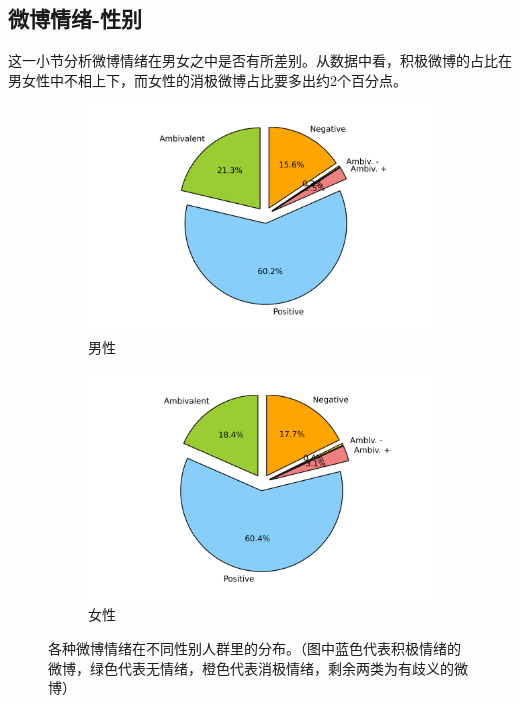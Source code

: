\documentclass[12pt, oneside]{article}
\begin{document}
\begin{spacing}{1.5}
\begin{CJK}{UTF8}{gbsn}
\subsection{微博情绪-性别}
这一小节分析微博情绪在男女之中是否有所差别。从数据中看，积极微博的占比在男女性中不相上下，而女性的消极微博占比要多出约2个百分点。

\begin{figure}
	\centering
	\begin{subfigure}[b]{0.45\linewidth}
		\centering
		\includegraphics[trim = 1.5cm 0 1.5cm 0, clip = true, width=\textwidth]{../result/charts/emotion_gender_m}
		\caption{男性}
	\end{subfigure}
	\begin{subfigure}[b]{0.45\linewidth}
		\centering
		\includegraphics[trim = 1.5cm 0 1.5cm 0, clip = true, width=\textwidth]{../result/charts/emotion_gender_f}
		\caption{女性}
	\end{subfigure}
	\caption{各种微博情绪在不同性别人群里的分布。（图中蓝色代表积极情绪的微博，绿色代表无情绪，橙色代表消极情绪，剩余两类为有歧义的微博）}
	\label{fig:emotion_gender}
\end{figure}


\end{CJK}
\end{spacing}
\end{document}
